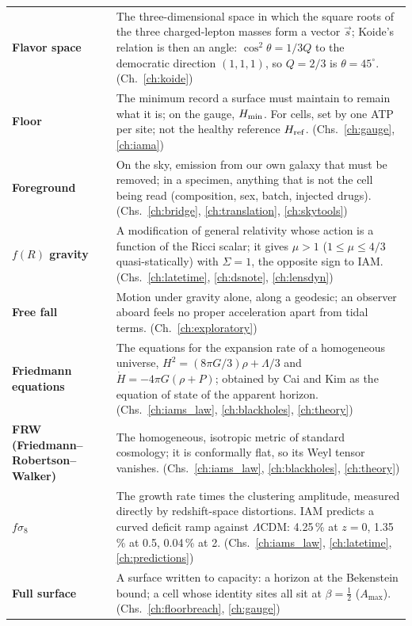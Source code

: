 {\begin{longtable}{@{}>{\raggedright\arraybackslash}p{}>{\raggedright\arraybackslash}p{}@{}}
\textbf{Flavor space} & The three-dimensional space in which the square roots of the three charged-lepton masses form a vector $\vec s$; Koide's relation is then an angle: $\cos^2\theta=1/3Q$ to the democratic direction $(1,1,1)$, so $Q=2/3$ is $\theta=45^\circ$. {\footnotesize(Ch.~\ref{ch:koide})}\\[1pt]
\textbf{Floor} & The minimum record a surface must maintain to remain what it is; on the gauge, $H_{\min}$. For cells, set by one ATP per site; not the healthy reference $H_{\rm ref}$. {\footnotesize(Chs.~\ref{ch:gauge}, \ref{ch:iama})}\\[1pt]
\textbf{Foreground} & On the sky, emission from our own galaxy that must be removed; in a specimen, anything that is not the cell being read (composition, sex, batch, injected drugs). {\footnotesize(Chs.~\ref{ch:bridge}, \ref{ch:translation}, \ref{ch:skytools})}\\[1pt]
\textbf{$f(R)$ gravity} & A modification of general relativity whose action is a function of the Ricci scalar; it gives $\mu>1$ ($1\le\mu\le4/3$ quasi-statically) with $\Sigma=1$, the opposite sign to IAM. {\footnotesize(Chs.~\ref{ch:latetime}, \ref{ch:dsnote}, \ref{ch:lensdyn})}\\[1pt]
\textbf{Free fall} & Motion under gravity alone, along a geodesic; an observer aboard feels no proper acceleration apart from tidal terms. {\footnotesize(Ch.~\ref{ch:exploratory})}\\[1pt]
\textbf{Friedmann equations} & The equations for the expansion rate of a homogeneous universe, $H^2=(8\pi G/3)\rho+\Lambda/3$ and $\dot H=-4\pi G(\rho+P)$; obtained by Cai and Kim as the equation of state of the apparent horizon. {\footnotesize(Chs.~\ref{ch:iams_law}, \ref{ch:blackholes}, \ref{ch:theory})}\\[1pt]
\textbf{FRW (Friedmann--Robertson--Walker)} & The homogeneous, isotropic metric of standard cosmology; it is conformally flat, so its Weyl tensor vanishes. {\footnotesize(Chs.~\ref{ch:iams_law}, \ref{ch:blackholes}, \ref{ch:theory})}\\[1pt]
\textbf{$f\sigma_8$} & The growth rate times the clustering amplitude, measured directly by redshift-space distortions. IAM predicts a curved deficit ramp against $\Lambda$CDM: 4.25\,\% at $z=0$, 1.35\,\% at 0.5, 0.04\,\% at 2. {\footnotesize(Chs.~\ref{ch:iams_law}, \ref{ch:latetime}, \ref{ch:predictions})}\\[1pt]
\textbf{Full surface} & A surface written to capacity: a horizon at the Bekenstein bound; a cell whose identity sites all sit at $\beta=\tfrac12$ ($A_{\max}$). {\footnotesize(Chs.~\ref{ch:floorbreach}, \ref{ch:gauge})}\\[1pt]

\end{longtable}}

